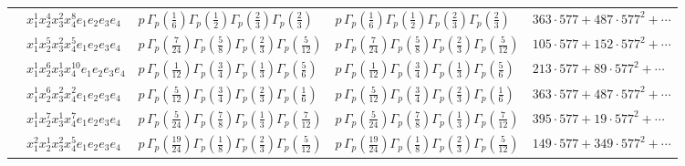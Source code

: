 \documentclass[11pt]{article}
\begin{document}
\begin{table}[ht]
{\begin{tabular}{@{}lllll@{}}
 & $x_{1}^{1} x_{2}^{4} x_{3}^{2} x_{4}^{8}  e_{1} e_{2} e_{3} e_{4}$ & $p \, \Gamma_p \left( \frac{1}{6} \right) \Gamma_p \left( \frac{1}{2} \right) \Gamma_p \left( \frac{2}{3} \right) \Gamma_p \left( \frac{2}{3} \right)$ & $p \, \Gamma_p \left( \frac{1}{6} \right) \Gamma_p \left( \frac{1}{2} \right) \Gamma_p \left( \frac{2}{3} \right) \Gamma_p \left( \frac{2}{3} \right)$ & $363{\cdot}577{+}487{\cdot}577^{2}{+}\cdots$ \\
 & $x_{1}^{1} x_{2}^{5} x_{3}^{2} x_{4}^{5}  e_{1} e_{2} e_{3} e_{4}$ & $p \, \Gamma_p \left( \frac{7}{24} \right) \Gamma_p \left( \frac{5}{8} \right) \Gamma_p \left( \frac{2}{3} \right) \Gamma_p \left( \frac{5}{12} \right)$ & $p \, \Gamma_p \left( \frac{7}{24} \right) \Gamma_p \left( \frac{5}{8} \right) \Gamma_p \left( \frac{2}{3} \right) \Gamma_p \left( \frac{5}{12} \right)$ & $105{\cdot}577{+}152{\cdot}577^{2}{+}\cdots$ \\
 & $x_{1}^{1} x_{2}^{6} x_{3}^{1} x_{4}^{10}  e_{1} e_{2} e_{3} e_{4}$ & $p \, \Gamma_p \left( \frac{1}{12} \right) \Gamma_p \left( \frac{3}{4} \right) \Gamma_p \left( \frac{1}{3} \right) \Gamma_p \left( \frac{5}{6} \right)$ & $p \, \Gamma_p \left( \frac{1}{12} \right) \Gamma_p \left( \frac{3}{4} \right) \Gamma_p \left( \frac{1}{3} \right) \Gamma_p \left( \frac{5}{6} \right)$ & $213{\cdot}577{+}89{\cdot}577^{2}{+}\cdots$ \\
 & $x_{1}^{1} x_{2}^{6} x_{3}^{2} x_{4}^{2}  e_{1} e_{2} e_{3} e_{4}$ & $p \, \Gamma_p \left( \frac{5}{12} \right) \Gamma_p \left( \frac{3}{4} \right) \Gamma_p \left( \frac{2}{3} \right) \Gamma_p \left( \frac{1}{6} \right)$ & $p \, \Gamma_p \left( \frac{5}{12} \right) \Gamma_p \left( \frac{3}{4} \right) \Gamma_p \left( \frac{2}{3} \right) \Gamma_p \left( \frac{1}{6} \right)$ & $363{\cdot}577{+}487{\cdot}577^{2}{+}\cdots$ \\
 & $x_{1}^{1} x_{2}^{7} x_{3}^{1} x_{4}^{7}  e_{1} e_{2} e_{3} e_{4}$ & $p \, \Gamma_p \left( \frac{5}{24} \right) \Gamma_p \left( \frac{7}{8} \right) \Gamma_p \left( \frac{1}{3} \right) \Gamma_p \left( \frac{7}{12} \right)$ & $p \, \Gamma_p \left( \frac{5}{24} \right) \Gamma_p \left( \frac{7}{8} \right) \Gamma_p \left( \frac{1}{3} \right) \Gamma_p \left( \frac{7}{12} \right)$ & $395{\cdot}577{+}19{\cdot}577^{2}{+}\cdots$ \\
 & $x_{1}^{2} x_{2}^{1} x_{3}^{2} x_{4}^{5}  e_{1} e_{2} e_{3} e_{4}$ & $p \, \Gamma_p \left( \frac{19}{24} \right) \Gamma_p \left( \frac{1}{8} \right) \Gamma_p \left( \frac{2}{3} \right) \Gamma_p \left( \frac{5}{12} \right)$ & $p \, \Gamma_p \left( \frac{19}{24} \right) \Gamma_p \left( \frac{1}{8} \right) \Gamma_p \left( \frac{2}{3} \right) \Gamma_p \left( \frac{5}{12} \right)$ & $149{\cdot}577{+}349{\cdot}577^{2}{+}\cdots$ \\

\end{tabular}}
\end{table}
\end{document}
